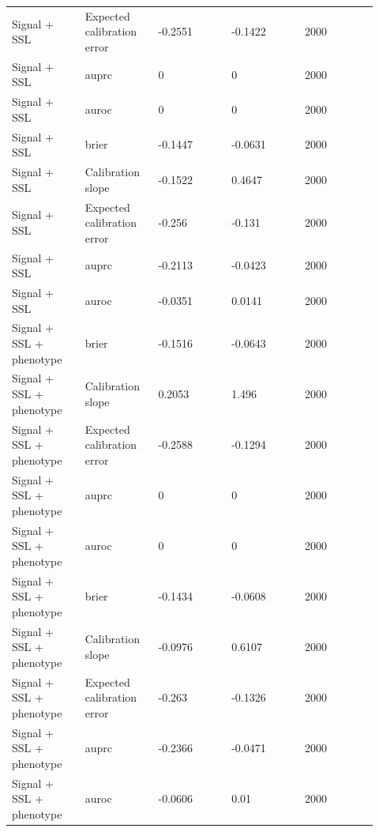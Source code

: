 \documentclass[11pt]{article}
\begin{document}
\begin{landscape}
\begin{longtable}{L{0.184\linewidth} L{0.184\linewidth} L{0.184\linewidth} L{0.184\linewidth} L{0.184\linewidth}}
Signal + SSL & Expected calibration error & -\allowbreak{}0.\allowbreak{}2551 & -\allowbreak{}0.\allowbreak{}1422 & 2000 \\
Signal + SSL & auprc & 0 & 0 & 2000 \\
Signal + SSL & auroc & 0 & 0 & 2000 \\
Signal + SSL & brier & -\allowbreak{}0.\allowbreak{}1447 & -\allowbreak{}0.\allowbreak{}0631 & 2000 \\
Signal + SSL & Calibration slope & -\allowbreak{}0.\allowbreak{}1522 & 0.\allowbreak{}4647 & 2000 \\
Signal + SSL & Expected calibration error & -\allowbreak{}0.\allowbreak{}256 & -\allowbreak{}0.\allowbreak{}131 & 2000 \\
Signal + SSL & auprc & -\allowbreak{}0.\allowbreak{}2113 & -\allowbreak{}0.\allowbreak{}0423 & 2000 \\
Signal + SSL & auroc & -\allowbreak{}0.\allowbreak{}0351 & 0.\allowbreak{}0141 & 2000 \\
Signal + SSL + phenotype & brier & -\allowbreak{}0.\allowbreak{}1516 & -\allowbreak{}0.\allowbreak{}0643 & 2000 \\
Signal + SSL + phenotype & Calibration slope & 0.\allowbreak{}2053 & 1.\allowbreak{}496 & 2000 \\
Signal + SSL + phenotype & Expected calibration error & -\allowbreak{}0.\allowbreak{}2588 & -\allowbreak{}0.\allowbreak{}1294 & 2000 \\
Signal + SSL + phenotype & auprc & 0 & 0 & 2000 \\
Signal + SSL + phenotype & auroc & 0 & 0 & 2000 \\
Signal + SSL + phenotype & brier & -\allowbreak{}0.\allowbreak{}1434 & -\allowbreak{}0.\allowbreak{}0608 & 2000 \\
Signal + SSL + phenotype & Calibration slope & -\allowbreak{}0.\allowbreak{}0976 & 0.\allowbreak{}6107 & 2000 \\
Signal + SSL + phenotype & Expected calibration error & -\allowbreak{}0.\allowbreak{}263 & -\allowbreak{}0.\allowbreak{}1326 & 2000 \\
Signal + SSL + phenotype & auprc & -\allowbreak{}0.\allowbreak{}2366 & -\allowbreak{}0.\allowbreak{}0471 & 2000 \\
Signal + SSL + phenotype & auroc & -\allowbreak{}0.\allowbreak{}0606 & 0.\allowbreak{}01 & 2000 \\
\end{longtable}
\normalsize
\end{landscape}
\end{document}
